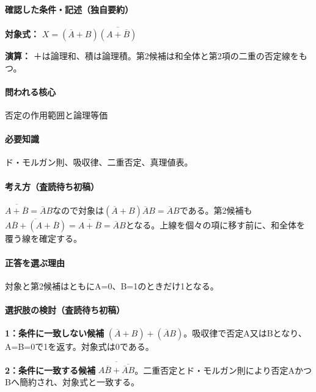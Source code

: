 \paragraph{確認した条件・記述（独自要約）}\mbox{}\par

\noindent\textbf{対象式：} \(X=(\overline A+B)\overline{(A+\overline B)}\)\par

\noindent\textbf{演算：} ＋は論理和、積は論理積。第2候補は和全体と第2項の二重の否定線をもつ。\par

\paragraph{問われる核心} 否定の作用範囲と論理等価

\paragraph{必要知識} ド・モルガン則、吸収律、二重否定、真理値表。

\paragraph{考え方（査読待ち初稿）} \(\overline{A+\overline B}=\overline A B\)なので対象は\((\overline A+B)\overline A B=\overline A B\)である。第2候補も\(\overline{A\overline B+(A+\overline B)}=\overline{A+\overline B}=\overline A B\)となる。上線を個々の項に移す前に、和全体を覆う線を確定する。

\paragraph{正答を選ぶ理由} 対象と第2候補はともにA=\allowbreak{}0、B=\allowbreak{}1のときだけ1となる。

\paragraph{選択肢の検討（査読待ち初稿）}\mbox{}\par

\noindent\textbf{1：条件に一致しない候補} \((\overline A+B)+(\overline A B)\)。吸収律で否定A又はBとなり、A=\allowbreak{}B=\allowbreak{}0で1を返す。対象式は0である。\par

\noindent\textbf{2：条件に一致する候補} \(\overline{A\overline B+\overline{\overline A B}}\)。二重否定とド・モルガン則により否定AかつBへ簡約され、対象式と一致する。\par

